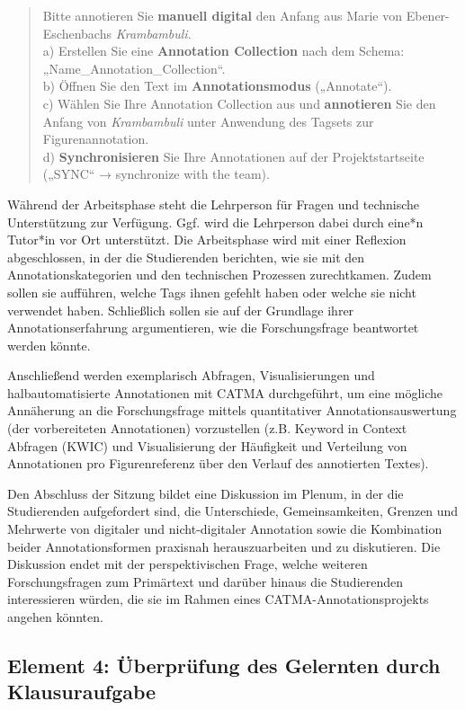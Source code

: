 \documentclass[
          a4paper,
        ]{article}
\begin{document}
\begin{quote}
Bitte annotieren Sie \textbf{manuell digital} den Anfang aus Marie von
Ebener-Eschenbachs \emph{Krambambuli}.\\
a) Erstellen Sie eine \textbf{Annotation Collection} nach dem Schema:
„Name\_Annotation\_Collection``.\\
b) Öffnen Sie den Text im \textbf{Annotationsmodus} („Annotate``).\\
c) Wählen Sie Ihre Annotation Collection aus und \textbf{annotieren} Sie
den Anfang von \emph{Krambambuli} unter Anwendung des Tagsets zur
Figurenannotation.\\
d) \textbf{Synchronisieren} Sie Ihre Annotationen auf der
Projektstartseite („SYNC`` → synchronize with the team).
\end{quote}

Während der Arbeitsphase steht die Lehrperson für Fragen und technische
Unterstützung zur Verfügung. Ggf. wird die Lehrperson dabei durch eine*n
Tutor*in vor Ort unterstützt. Die Arbeitsphase wird mit einer Reflexion
abgeschlossen, in der die Studierenden berichten, wie sie mit den
Annotationskategorien und den technischen Prozessen zurechtkamen. Zudem
sollen sie aufführen, welche Tags ihnen gefehlt haben oder welche sie
nicht verwendet haben. Schließlich sollen sie auf der Grundlage ihrer
Annotationserfahrung argumentieren, wie die Forschungsfrage beantwortet
werden könnte.

Anschließend werden exemplarisch Abfragen, Visualisierungen und
halbautomatisierte Annotationen mit CATMA durchgeführt, um eine mögliche
Annäherung an die Forschungsfrage mittels quantitativer
Annotationsauswertung (der vorbereiteten Annotationen) vorzustellen
(z.B. Keyword in Context Abfragen (KWIC) und Visualisierung der
Häufigkeit und Verteilung von Annotationen pro Figurenreferenz über den
Verlauf des annotierten Textes).

Den Abschluss der Sitzung bildet eine Diskussion im Plenum, in der die
Studierenden aufgefordert sind, die Unterschiede, Gemeinsamkeiten,
Grenzen und Mehrwerte von digitaler und nicht-digitaler Annotation sowie
die Kombination beider Annotationsformen praxisnah herauszuarbeiten und
zu diskutieren. Die Diskussion endet mit der perspektivischen Frage,
welche weiteren Forschungsfragen zum Primärtext und darüber hinaus die
Studierenden interessieren würden, die sie im Rahmen eines
CATMA-Annotationsprojekts angehen könnten.

\subsection{Element 4: Überprüfung des Gelernten durch
Klausuraufgabe}\label{element-4-uxfcberpruxfcfung-des-gelernten-durch-klausuraufgabe}
\end{document}
